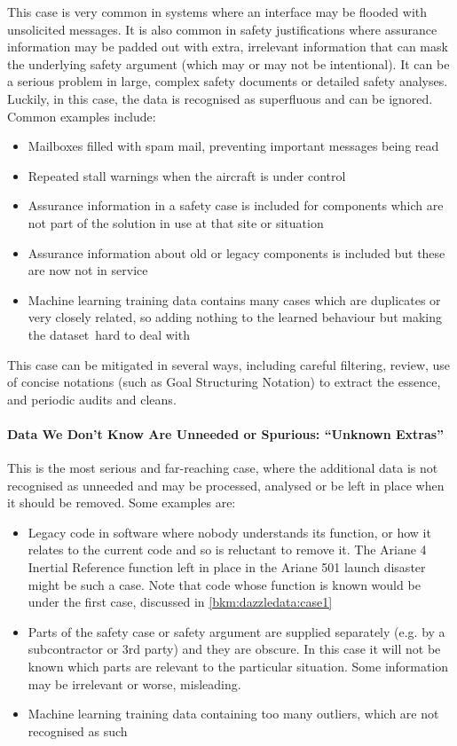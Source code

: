 This case is very common in systems where an interface may be flooded with unsolicited messages.
It is also common in  safety justifications where assurance \gls{information} may be padded out with extra, irrelevant \gls{information} that can mask the underlying safety argument (which may or may not be intentional).
It can be a serious problem in large, complex safety documents or detailed safety analyses.
Luckily, in this case, the data is recognised as superfluous and can be ignored.
Common examples include:
\begin{itemize}
    \item Mailboxes filled with spam mail, preventing important messages being read
    \item Repeated stall warnings when the aircraft is under control
    \item Assurance \gls{information} in a safety case is included for components which are not part of the solution in use at that site or situation
    \item Assurance \gls{information} about old or legacy components is included but these are now not in service
    \item Machine learning training data contains many cases which are duplicates or very closely related, so adding nothing to the learned behaviour but making the \cbstart\gls{dataset}\cbend\ hard to deal with
\end{itemize}
This case can be mitigated in several ways, including careful filtering, review, use of concise  notations (such as Goal Structuring Notation) to extract the essence, and periodic audits and cleans. 

\paragraph{Data We Don’t Know Are Unneeded or Spurious: ``Unknown Extras''}
This is the most serious and far-reaching case, where the additional data is not recognised as unneeded and may be processed, analysed or be left in place when it should be removed. Some examples are:
\begin{itemize}
\item Legacy code in software where nobody understands its function, or how it relates to the current code and so is reluctant to remove it. The Ariane 4 Inertial Reference function left in place in the Ariane 501 launch disaster might be such a case. Note that code whose function is known would be under the first case, discussed in \ref{bkm:dazzledata:case1}
    \item Parts of the safety case or safety argument are supplied separately (e.g. by a subcontractor or 3rd party) and they are obscure. In this case it will not be known which parts are relevant to the particular situation. Some \gls{information} may be irrelevant or worse, misleading.
    \item Machine learning training data containing too many outliers, which are not recognised as such
\end{itemize}


